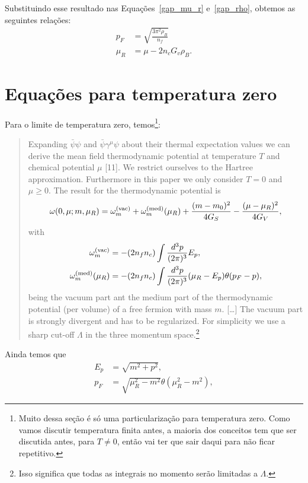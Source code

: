 Substituindo esse resultado nas Equações~\eqref{gap_mu_r} e~\eqref{gap_rho}, obtemos as seguintes relações:
\begin{align}
	p_F &= \sqrt{\frac{3\pi^2\rho_B}{n_f}} \\
	\mu_R &= \mu - 2 n_c G_v \rho_B.
\end{align}	

\section{Equações para temperatura zero}

Para o limite de temperatura zero, temos\cite{Buballa1996}\footnote{Muito dessa seção é só uma particularização para temperatura zero. Como vamos discutir temperatura finita antes, a maioria dos conceitos tem que ser discutida antes, para $T \neq 0$, então vai ter que sair daqui para não ficar repetitivo.}:
\begin{quote}
Expanding $\bar{\psi}\psi$ and $\bar{\psi}\gamma^\mu\psi$ about their thermal expectation values we can derive the mean field thermodynamic potential at temperature $T$ and chemical potential $\mu$ [11]. We restrict ourselves to the Hartree approximation. Furthermore in this paper we only consider $T=0$ and $\mu \geqslant 0$. The result for the thermodynamic potential is
\begin{equation}\label{Eq:Def_pot_termo}
	\omega(0,\mu; m, \mu_R) = \omega_m^{\rm{(vac)}} + \omega_m^{\rm{(med)}}(\mu_R) + \frac{(m - m_0)^2}{4G_S} - \frac{(\mu - \mu_R)^2}{4G_V},
\end{equation}
%
with
\begin{align}
	\omega_m^{\rm{(vac)}} &= - (2n_fn_c) \int \frac{d^3p}{(2\pi)^3} E_p, \label{Eq:Def_omega_vac}\\
	\omega_m^{\rm{(med)}}(\mu_R) &= - (2n_fn_c) \int \frac{d^3p}{(2\pi)^3}(\mu_R - E_p)\theta(p_F - p), \label{Eq:Def_omega_med}
\end{align}
%
being the vacuum part ant the medium part of the thermodynamic potential (per volume) of a free fermion with mass $m$. [\dots] The vacuum part is strongly divergent and has to be regularized. For simplicity we use a sharp cut-off $\Lambda$ in the three momentum space.\footnote{Isso significa que todas as integrais no momento serão limitadas a $\Lambda$.}
\end{quote}
%
Ainda temos que
\begin{align}
	E_p &= \sqrt{m^2+p^2}, \label{Eq:Def_E}\\
	p_F &= \sqrt{\mu_R^2 - m^2}\theta(\mu_R^2 - m^2), \label{Eq:Rel_pot_quim_renorm_mom_fermi}
\end{align}
